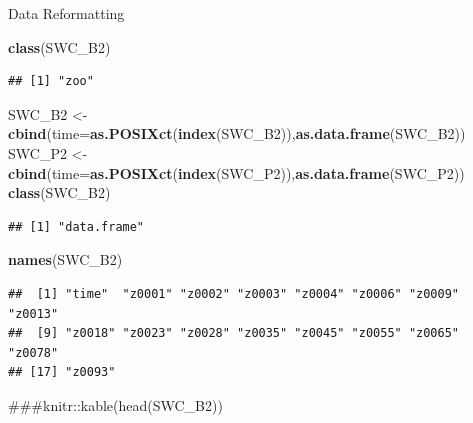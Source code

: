 \documentclass[ignorenonframetext,]{beamer}
\newenvironment{Shaded}{\begin{snugshade}}{\end{snugshade}}
\newcommand{\KeywordTok}[1]{\textcolor[rgb]{0.13,0.29,0.53}{\textbf{#1}}}
\newcommand{\DataTypeTok}[1]{\textcolor[rgb]{0.13,0.29,0.53}{#1}}
\newcommand{\StringTok}[1]{\textcolor[rgb]{0.31,0.60,0.02}{#1}}
\newcommand{\NormalTok}[1]{#1}
\begin{document}
\begin{frame}[fragile]{Data Reformatting}

\begin{Shaded}
\begin{Highlighting}[]
\KeywordTok{class}\NormalTok{(SWC_B2)}
\end{Highlighting}
\end{Shaded}

\begin{verbatim}
## [1] "zoo"
\end{verbatim}

\begin{Shaded}
\begin{Highlighting}[]
\NormalTok{SWC_B2 <-}\StringTok{ }\KeywordTok{cbind}\NormalTok{(}\DataTypeTok{time=}\KeywordTok{as.POSIXct}\NormalTok{(}\KeywordTok{index}\NormalTok{(SWC_B2)),}\KeywordTok{as.data.frame}\NormalTok{(SWC_B2))}
\NormalTok{SWC_P2 <-}\StringTok{ }\KeywordTok{cbind}\NormalTok{(}\DataTypeTok{time=}\KeywordTok{as.POSIXct}\NormalTok{(}\KeywordTok{index}\NormalTok{(SWC_P2)),}\KeywordTok{as.data.frame}\NormalTok{(SWC_P2))}
\KeywordTok{class}\NormalTok{(SWC_B2)}
\end{Highlighting}
\end{Shaded}

\begin{verbatim}
## [1] "data.frame"
\end{verbatim}

\begin{Shaded}
\begin{Highlighting}[]
\KeywordTok{names}\NormalTok{(SWC_B2)}
\end{Highlighting}
\end{Shaded}

\begin{verbatim}
##  [1] "time"  "z0001" "z0002" "z0003" "z0004" "z0006" "z0009" "z0013"
##  [9] "z0018" "z0023" "z0028" "z0035" "z0045" "z0055" "z0065" "z0078"
## [17] "z0093"
\end{verbatim}

\begin{Shaded}
\begin{Highlighting}[]
\NormalTok{###knitr::kable(head(SWC_B2))}
\end{Highlighting}
\end{Shaded}

\end{frame}
\end{document}
